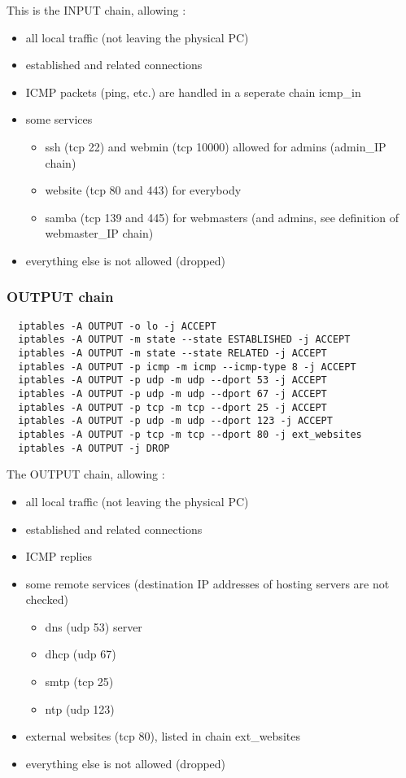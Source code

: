 \documentclass[a4paper,12pt]{article}
\begin{document}
This is the INPUT chain, allowing :
\begin{itemize}
  \item all local traffic (not leaving the physical PC)
  \item established and related connections
  \item ICMP packets (ping, etc.) are handled in a seperate chain icmp\_in
  \item some services
  \begin{itemize}
    \item ssh (tcp 22) and webmin (tcp 10000) allowed for admins (admin\_IP chain)
    \item website (tcp 80 and 443) for everybody
    \item samba (tcp 139 and 445) for webmasters (and admins, see definition of webmaster\_IP chain)
  \end{itemize}
  \item everything else is not allowed (dropped)
\end{itemize}

\subsubsection{OUTPUT chain}

\begin{verbatim}
  iptables -A OUTPUT -o lo -j ACCEPT
  iptables -A OUTPUT -m state --state ESTABLISHED -j ACCEPT
  iptables -A OUTPUT -m state --state RELATED -j ACCEPT
  iptables -A OUTPUT -p icmp -m icmp --icmp-type 8 -j ACCEPT
  iptables -A OUTPUT -p udp -m udp --dport 53 -j ACCEPT
  iptables -A OUTPUT -p udp -m udp --dport 67 -j ACCEPT
  iptables -A OUTPUT -p tcp -m tcp --dport 25 -j ACCEPT
  iptables -A OUTPUT -p udp -m udp --dport 123 -j ACCEPT
  iptables -A OUTPUT -p tcp -m tcp --dport 80 -j ext_websites
  iptables -A OUTPUT -j DROP
\end{verbatim}

The OUTPUT chain, allowing :
\begin{itemize}
  \item all local traffic (not leaving the physical PC)
  \item established and related connections
  \item ICMP replies
  \item some remote services (destination IP addresses of hosting servers are not checked)
  \begin{itemize}
    \item dns (udp 53) server
    \item dhcp (udp 67)
    \item smtp (tcp 25)
    \item ntp (udp 123)
  \end{itemize}
  \item external websites (tcp 80), listed in chain ext\_websites
  \item everything else is not allowed (dropped)
\end{itemize}
\end{document}
